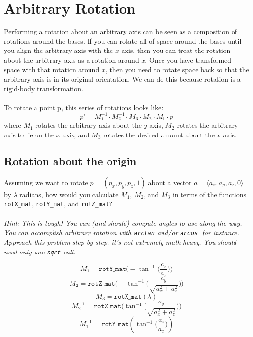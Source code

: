 \documentclass[10pt,twocolumn]{article}
\begin{document}
\section{Arbitrary Rotation}
Performing a rotation about an arbitrary axis can be seen as a composition of rotations around the bases. If you can rotate all of space around the bases until you align the arbitrary axis with the $x$ axis, then you can treat the rotation about the arbitrary axis as a rotation around $x$. Once you have transformed space with that rotation around $x$, then you need to rotate space back so that the arbitrary axis is in its original orientation. We can do this because rotation is a rigid-body transformation.\\\\
To rotate a point p, this series of rotations looks like:
\[p' = M^{-1}_1\cdot M^{-1}_2 \cdot M_3 \cdot M_2 \cdot M_1 \cdot p\]
where $M_1$ rotates the arbitrary axis about the $y$ axis, $M_2$ rotates the arbitrary axis to lie on the $x$ axis, and $M_3$ rotates the desired amount about the $x$ axis.

\subsection{Rotation about the origin}
\begin{framed}
\noindent{\bf [1.5 points]} Assuming we want to rotate $p=(p_x,p_y,p_z,1)$ about a vector $a = \langle a_x,a_y,a_z,0\rangle$ by $\lambda$ radians, how would you calculate $M_1$, $M_2$, and $M_3$ in terms of the functions {\tt rotX\_mat}, {\tt rotY\_mat}, and {\tt rotZ\_mat}?\\\\
\emph{Hint: This is tough! You can (and should) compute angles to use along the way. You can accomplish arbitrary rotation with {\tt arctan} and/or {\tt arcos}, for instance. Approach this problem step by step, it's not extremely math heavy. You should need only one {\tt sqrt} call.}
\end{framed}

\begin{framed}
\[M_1 = \mathtt{rotY\_mat}\Big(-\tan^{-1}\Big(\frac{a_z}{a_x}\Big)\Big)\]
\[M_2 = \mathtt{rotZ\_mat}\Big(-\tan^{-1}\Big(\frac{a_y}{\sqrt{a_x^2+a_z^2}}\Big)\Big)\]
\[M_3 = \mathtt{rotX\_mat}(\lambda)\]
\[M_2^{-1} = \mathtt{rotZ\_mat}\Big(\tan^{-1}\Big(\frac{a_y}{\sqrt{a_x^2+a_z^2}}\Big)\Big)\]
\[M_1^{-1} = \mathtt{rotY\_mat}(\tan^{-1}\Big(\frac{a_z}{a_x}\Big))\]

\end{framed}
\end{document}
